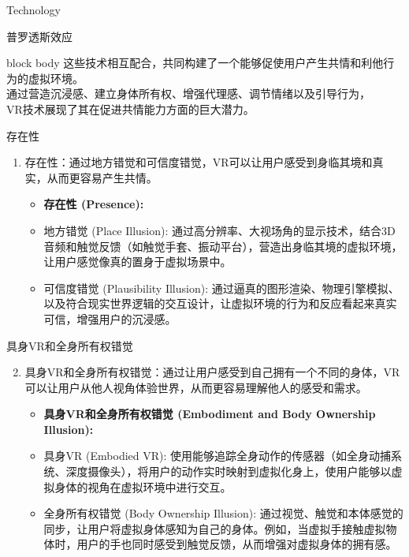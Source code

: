 \documentclass[aspectratio=169,xcolor=dvipsnames]{beamer}
\begin{document}
\begin{frame}{Technology}
\begin{block}{\color{white!80!black}普罗透斯效应}
    \end{block}
    
    \vspace{0.3cm}
    
    \begin{beamercolorbox}[wd=0.9\textwidth,center,sep=4pt,rounded=true,shadow=true]{block body}
        \footnotesize
        这些技术相互配合，共同构建了一个能够促使用户产生共情和利他行为的虚拟环境。\\
        通过营造沉浸感、建立身体所有权、增强代理感、调节情绪以及引导行为，\\
        VR技术展现了其在促进共情能力方面的巨大潜力。
    \end{beamercolorbox}
\end{frame}


\begin{frame}{存在性}
    \begin{enumerate}
        \item 存在性：通过地方错觉和可信度错觉，VR可以让用户感受到身临其境和真实，从而更容易产生共情。
        \begin{itemize}
            \item \textbf{存在性 (Presence):}
            \item 地方错觉 (Place Illusion): 通过高分辨率、大视场角的显示技术，结合3D音频和触觉反馈（如触觉手套、振动平台），营造出身临其境的虚拟环境，让用户感觉像真的置身于虚拟场景中。
            \item 可信度错觉 (Plausibility Illusion): 通过逼真的图形渲染、物理引擎模拟、以及符合现实世界逻辑的交互设计，让虚拟环境的行为和反应看起来真实可信，增强用户的沉浸感。
        \end{itemize}
    \end{enumerate}
\end{frame}

\begin{frame}{具身VR和全身所有权错觉}
    \begin{enumerate}
        \setcounter{enumi}{1}
        \item 具身VR和全身所有权错觉：通过让用户感受到自己拥有一个不同的身体，VR可以让用户从他人视角体验世界，从而更容易理解他人的感受和需求。
        \begin{itemize}
            \item \textbf{具身VR和全身所有权错觉 (Embodiment and Body Ownership Illusion):}
            \item 具身VR (Embodied VR): 使用能够追踪全身动作的传感器（如全身动捕系统、深度摄像头），将用户的动作实时映射到虚拟化身上，使用户能够以虚拟身体的视角在虚拟环境中进行交互。
            \item 全身所有权错觉 (Body Ownership Illusion): 通过视觉、触觉和本体感觉的同步，让用户将虚拟身体感知为自己的身体。例如，当虚拟手接触虚拟物体时，用户的手也同时感受到触觉反馈，从而增强对虚拟身体的拥有感。
        \end{itemize}
    \end{enumerate}
\end{frame}
\end{document}

